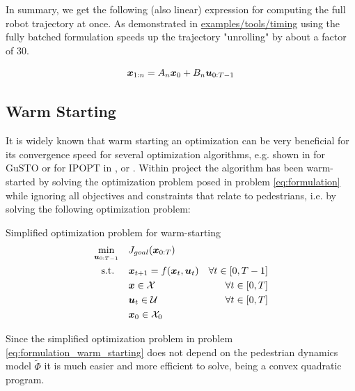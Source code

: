 In summary, we get the following (also linear) expression for computing the full robot trajectory at once. As demonstrated in \href{https://github.com/simon-schaefer/mantrap/blob/master/examples/tools/timing.ipynb}{examples/tools/timing} using the fully batched formulation speeds up the trajectory "unrolling" by about a factor of 30.  

\begin{equation}
\boldsymbol{x}_{1:n} = A_n \boldsymbol{x}_0 + B_n \boldsymbol{u}_{0:T-1}
\label{eq:dynamics_stacked}
\end{equation}

\subsection{Warm Starting}
\label{text:approach/runtime/warm_starting}
It is widely known that warm starting an optimization can be very beneficial for its convergence speed for several optimization algorithms, e.g. shown in \cite{Banerjee2020} for \ac{GuSTO} or for \ac{IPOPT} in \cite{Shahzad2010}, \cite{John2008} or \cite{Spielberge2019}.
\newline
Within project \project the algorithm has been warm-started by solving the optimization problem posed in problem \ref{eq:formulation} while ignoring all objectives and constraints that relate to pedestrians, i.e. by solving the following optimization problem: \\

\begin{problem}{Simplified \project optimization problem for warm-starting}
\begin{align}
\min_{\boldsymbol{u}_{0:T-1}} \quad & J_{goal}(\boldsymbol{x}_{0:T}) \\
\textrm{s.t. } \quad & \boldsymbol{x}_{t+1} = f(\boldsymbol{x}_t, \boldsymbol{u}_t) & \forall t \in [0, T - 1] \\
& \boldsymbol{x} \in \mathcal{X} & \forall t \in [0, T]\\
& \boldsymbol{u}_t \in \mathcal{U} & \forall t \in [0, T]\\
& \boldsymbol{x}_0 \in \mathcal{X}_0
\end{align} 
\label{eq:formulation_warm_starting}
\end{problem}

Since the simplified optimization problem in problem \ref{eq:formulation_warm_starting} does not depend on the pedestrian dynamics model $\tilde{\Phi}$ it is much easier and more efficient to solve, being a convex quadratic program. \\


